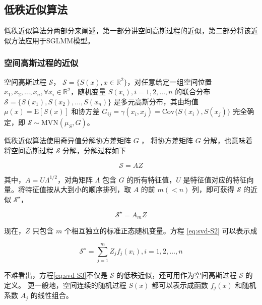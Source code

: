 \documentclass[12pt,a4paper,UTF8,twoside]{book}
\theoremstyle{definition}
\theoremstyle{definition}
\theoremstyle{definition}
\theoremstyle{remark}
\begin{document}
\hypertarget{LowRank}{%
\subsection{低秩近似算法}\label{LowRank}}

低秩近似算法分两部分来阐述，第一部分讲空间高斯过程的近似，第二部分将该近似方法应用于SGLMM模型。

\hypertarget{low-rank-gp}{%
\subsubsection{空间高斯过程的近似}\label{low-rank-gp}}

空间高斯过程 \(\mathcal{S}\)，
\(\mathcal{S} = \{S(x),x\in\mathbb{R}^2\}\)，对任意给定一组空间位置
\(x_1,x_2,\ldots,x_n, \forall x_{i} \in \mathbb{R}^2\)，随机变量
\(S(x_i),i = 1,2,\ldots,n\) 的联合分布
\(\mathcal{S}=\{S(x_1),S(x_2),\ldots,S(x_n)\}\) 是多元高斯分布，其由均值
\(\mu(x) = \mathrm{E}[S(x)]\) 和协方差
\(G_{ij} =\gamma(x_i,x_j)= \mathrm{Cov}\{S(x_i),S(x_j)\}\) 完全确定，即
\(\mathcal{S} \sim \mathrm{MVN}(\mu_{S},G)\)。

低秩近似算法使用奇异值分解协方差矩阵 \(G\) \citep{Diggle2007}，
将协方差矩阵 \(G\) 分解，也意味着将空间高斯过程 \(\mathcal{S}\)
分解，分解过程如下

\begin{equation}
\mathcal{S} = AZ \label{eq:svd-S1}
\end{equation}

\noindent 其中，\(A = U\Lambda^{1/2}\)，对角矩阵 \(\Lambda\) 包含 \(G\)
的所有特征值，\(U\)
是特征值对应的特征向量。将特征值按从大到小的顺序排列，取 \(A\) 的前
\(m(<n)\) 列，即可获得 \(\mathcal{S}\) 的近似 \(\mathcal{S}^{\star}\)，

\begin{equation}
\mathcal{S}^{\star} = A_{m}Z \label{eq:svd-S2}
\end{equation}

\noindent 现在，\(Z\) 只包含 \(m\) 个相互独立的标准正态随机变量。方程
\eqref{eq:svd-S2} 可以表示成

\begin{equation}
\mathcal{S}^{\star} = \sum_{j=1}^{m}Z_{j}f_{j}(x_{i}), i = 1,2,\ldots,n \label{eq:svd-S3}
\end{equation}

\noindent 不难看出，方程\eqref{eq:svd-S3}不仅是 \(\mathcal{S}\)
的低秩近似，还可用作为空间高斯过程 \(\mathcal{S}\) 的定义。
更一般地，空间连续的随机过程 \(S(x)\) 都可以表示成函数 \(f_{j}(x)\)
和随机系数 \(A_{j}\) 的线性组合。
\end{document}
